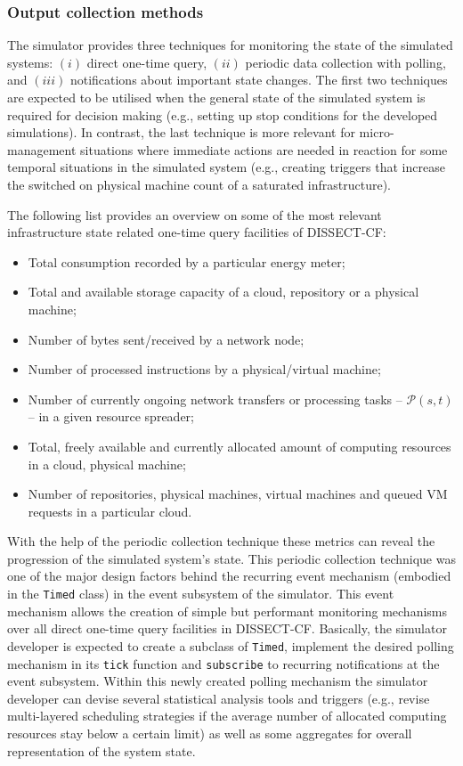 \documentclass[sort, compress, 5p]{elsarticle}
\begin{document}
\subsubsection{Output collection methods}

The simulator provides three techniques for monitoring the state of the simulated systems: $(i)$ direct one-time query, $(ii)$ periodic data collection with polling, and $(iii)$ notifications about important state changes. The first two techniques are expected to be utilised when the general state of the simulated system is required for decision making (e.g., setting up stop conditions for the developed simulations). In contrast, the last technique is more relevant for micro-management situations where immediate actions are needed in reaction for some temporal situations in the simulated system (e.g., creating triggers that increase the switched on physical machine count of a saturated infrastructure).

The following list provides an overview on some of the most relevant infrastructure state related one-time query facilities of DISSECT-CF:
\begin{itemize}
\item Total consumption recorded by a particular energy meter;
\item Total and available storage capacity of a cloud, repository or a physical machine;
\item Number of bytes sent/received by a network node;
\item Number of processed instructions by a physical/virtual machine;
\item Number of currently ongoing network transfers or processing tasks -- $\mathcal{P}(s,t)$ -- in a given resource spreader;
\item Total, freely available and currently allocated amount of computing resources in a cloud, physical machine;
\item Number of repositories, physical machines, virtual machines and queued VM requests in a particular cloud.
\end{itemize}
With the help of the periodic collection technique these metrics can reveal the progression of the simulated system's state. This periodic collection technique was one of the major design factors behind the recurring event mechanism (embodied in the \verb+Timed+ class) in the event subsystem of the simulator. This event mechanism allows the creation of simple but performant monitoring mechanisms over all direct one-time query facilities in DISSECT-CF. Basically, the simulator developer is expected to create a subclass of \verb+Timed+, implement the desired polling mechanism in its \verb+tick+ function and \verb+subscribe+ to recurring notifications at the event subsystem. Within this newly created polling mechanism the simulator developer can devise several statistical analysis tools and triggers (e.g., revise multi-layered scheduling strategies if the average number of allocated computing resources stay below a certain limit) as well as some aggregates for overall representation of the system state.
\end{document}
